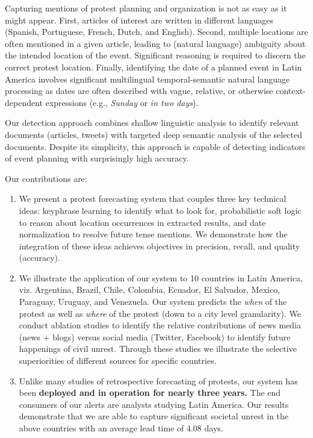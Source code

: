 \documentclass[letterpaper]{article}
\begin{document}
Capturing mentions of protest planning and organization is not as easy
as it might appear. First, articles of interest are written in different
languages (Spanish, Portuguese, French, Dutch, and English).  Second,
multiple locations are often mentioned in a given article, leading to
(natural language) ambiguity about the intended location of the event.
Significant reasoning is required to discern the correct protest
location.  Finally, identifying the date of a planned event in Latin
America involves significant multilingual temporal-semantic natural
language processing as dates are often described with vague, relative,
or otherwise context-dependent expressions (e.g., {\em Sunday} or {\em
in two days}).


Our detection approach combines shallow linguistic analysis to identify
relevant documents (articles, tweets) with targeted deep semantic
analysis of the selected documents. Despite its simplicity, this
approach is capable of detecting indicators of event planning with
surprisingly high accuracy.

Our contributions are:

\begin{enumerate}
\item We present a protest forecasting system that couples three key
  technical ideas: keyphrase learning to identify what to look for,
  probabilistic soft logic to reason about location occurrences in
  extracted results, and date normalization to resolve future tense
  mentions. We demonstrate how the integration of these ideas achieves
  objectives in precision, recall, and quality (accuracy).
\item We illustrate the application of our system to 10 countries in
  Latin America, viz. Argentina, Brazil, Chile, Colombia, Ecuador, El
  Salvador, Mexico, Paraguay, Uruguay, and Venezuela. Our system
  predicts the {\it when} of the protest as well as {\it where} of the
  protest (down to a city level granularity).  We conduct ablation
  studies to identify the relative contributions of news media (news +
  blogs) versus social media (Twitter, Facebook) to identify future
  happenings of civil unrest. Through these studies we illustrate the
  selective superiorities of different sources for specific countries.
\item Unlike many studies of retrospective forecasting of protests, our
  system has been {\bf deployed and in operation for nearly three
  years.} The end consumers of our alerts are analysts studying Latin
  America.
Our results demonstrate that we are able to capture significant societal
unrest in the above countries with an average lead time of 4.08 days. 
\end{enumerate}
\end{document}
